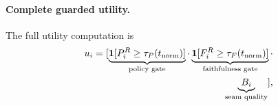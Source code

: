 \paragraph{Complete guarded utility.}
The full utility computation is
\begin{equation}
\begin{aligned}
  u_i =[
    \underbrace{\mathbf{1}[P_i^R \geq \tau_P(t_\text{norm})]}_{\text{policy gate}}
    \cdot  
    \underbrace{\mathbf{1}[F_i^R \geq\tau_F(t_\text{norm})]}_{\text{faithfulness gate}}\cdot \\ \underbrace{B_i}_{\text{seam quality}}], \notag
  \label{eq:guard_utility_full}
  \end{aligned}
\end{equation}
